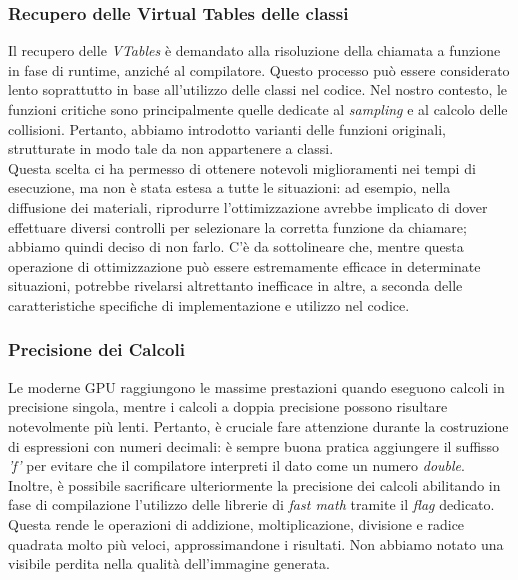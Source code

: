 \documentclass[main.tex]{subfiles}
\begin{document}
\subsubsection{Recupero delle Virtual Tables delle classi}
Il recupero delle \textit{VTables} è demandato alla risoluzione della chiamata a funzione in fase di runtime, anziché al compilatore. Questo processo può essere considerato lento soprattutto in base all'utilizzo delle classi nel codice. Nel nostro contesto, le funzioni critiche sono principalmente quelle dedicate al \textit{sampling} e al calcolo delle collisioni. Pertanto, abbiamo introdotto varianti delle funzioni originali, strutturate in modo tale da non appartenere a classi. \\
Questa scelta ci ha permesso di ottenere notevoli miglioramenti nei tempi di esecuzione, ma non è stata estesa a tutte le situazioni: ad esempio, nella diffusione dei materiali, riprodurre l'ottimizzazione avrebbe implicato di dover effettuare diversi controlli per selezionare la corretta funzione da chiamare; abbiamo quindi deciso di non farlo. 
C'è da sottolineare che, mentre questa operazione di ottimizzazione può essere estremamente efficace in determinate situazioni, potrebbe rivelarsi altrettanto inefficace in altre, a seconda delle caratteristiche specifiche di implementazione e utilizzo nel codice.

\subsubsection{Precisione dei Calcoli}
Le moderne GPU raggiungono le massime prestazioni quando eseguono calcoli in precisione singola, mentre i calcoli a doppia precisione possono risultare notevolmente più lenti. Pertanto, è cruciale fare attenzione durante la costruzione di espressioni con numeri decimali: è sempre buona pratica aggiungere il suffisso \textit{'f'} per evitare che il compilatore interpreti il dato come un numero \textit{double}. \\
Inoltre, è possibile sacrificare ulteriormente la precisione dei calcoli abilitando in fase di compilazione l'utilizzo delle librerie di \textit{fast math} tramite il \textit{flag} dedicato. Questa rende le operazioni di addizione, moltiplicazione, divisione e radice quadrata molto più veloci, approssimandone i risultati. Non abbiamo notato una visibile perdita nella qualità dell'immagine generata.
\end{document}
